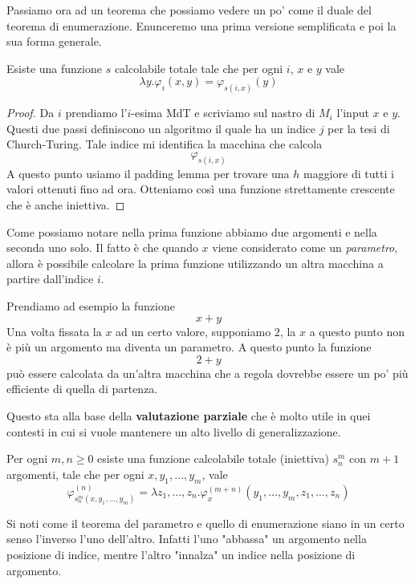 Passiamo ora ad un teorema che possiamo vedere un po' come il
duale del teorema di enumerazione. Enunceremo una prima versione
semplificata e poi la sua forma generale.

\begin{theorem}
	\label{th: s-1-1}
	Esiste una funzione $s$ calcolabile totale tale che per ogni
	$i$, $x$ e $y$ vale
	\[ \lambda y . \varphi_i (x, y) = \varphi_{s (i, x)} (y) \]
	\begin{proof}
		Da $i$ prendiamo l'$i$-esima MdT e scriviamo sul nastro
		di $M_i$ l'input $x$ e $y$. Questi due passi definiscono
		un algoritmo il quale ha un indice $j$ per la tesi di
		Church-Turing. Tale indice mi identifica la macchina che
		calcola
		\[ \varphi_{s(i,x)} \]
		A questo punto usiamo il padding lemma per trovare una
		$h$ maggiore di tutti i valori ottenuti fino ad ora.
		Otteniamo così una funzione strettamente crescente che
		è anche iniettiva.
	\end{proof}
\end{theorem}

Come possiamo notare nella prima funzione abbiamo due argomenti
e nella seconda uno solo. Il fatto è che quando $x$ viene
considerato come un \emph{parametro}, allora è possibile
calcolare la prima funzione utilizzando un altra macchina a
partire dall'indice $i$.

\begin{example}
	Prendiamo ad esempio la funzione
	\[ x + y \]
	Una volta fissata la $x$ ad un certo valore, supponiamo
	$2$, la $x$ a questo punto non è più un argomento ma
	diventa un parametro. A questo punto la funzione
	\[ 2 + y \]
	può essere calcolata da un'altra macchina che a regola
	dovrebbe essere un po' più efficiente di quella di partenza.
\end{example}

Questo sta alla base della \textbf{valutazione parziale} che è
molto utile in quei contesti in cui si vuole mantenere un alto
livello di generalizzazione.

\begin{theorem}
	\label{th: s-m-n}
	Per ogni $m, n \geq 0$ esiste una funzione calcolabile
	totale (iniettiva) $s_n^m$ con $m+1$ argomenti, tale che
	per ogni $x, y_1, \dots, y_m$, vale
	\[
		\varphi_{s_n^m (x, y_1, \dots, y_m)}^{(n)} =
		\lambda z_1, \dots, z_n .
		\varphi_x^{(m+n)} (y_1, \dots, y_m, z_1, \dots, z_n)
	\]
\end{theorem}

Si noti come il teorema del parametro e quello di enumerazione
siano in un certo senso l'inverso l'uno dell'altro. Infatti
l'uno "abbassa" un argomento nella posizione di indice, mentre
l'altro "innalza" un indice nella posizione di argomento.


